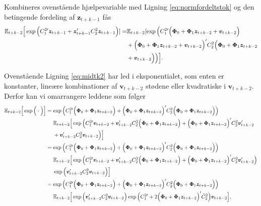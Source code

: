 \documentclass[
  a4paper,
  oneside]{memoir}
\begin{document}
Kombineres ovenstående hjælpevariable med Ligning \eqref{eq:normfordeltstok} og den betingende fordeling af \(\bm{z}_{t+k-1}\) fås
\begin{align}
\mathbb{E}_{t+k-2}\Big[ \exp\Big( C_1^{2\prime} \bm{z}_{t+k-1} + \bm{z}_{t+k-1}' C_2^2 \bm{z}_{t+k-1} \Big) ] = &\mathbb{E}_{t+k-2}[ \exp \Big( C_1^{2\prime} \Big(\bm{\Phi}_0+\bm{\Phi}_1\bm{z}_{t+k-2} + \bm{v}_{t+k-2} \Big) \notag\\
                                                                                                  &+ \Big(\bm{\Phi}_0+\bm{\Phi}_1\bm{z}_{t+k-2} + \bm{v}_{t+k-2}\Big)' C_2^2 \Big(\bm{\Phi}_0+\bm{\Phi}_1\bm{z}_{t+k-2}\notag\\
                                                                                                  &+ \bm{v}_{t+k-2}\Big) \Big) \Big]. \label{eq:midtk2}
\end{align}

Ovenstående Ligning \eqref{eq:midtk2} har led i eksponentialet, som enten er konstanter, lineære kombinationer af \(\bm{v}_{t+k-2}\) stødene eller kvadratiske i \(\bm{v}_{t+k-2}\). Derfor kan vi omarrangere leddene som følger
\begin{align}
\mathbb{E}_{t+k-2}\Big[\exp\Big(\cdot\Big)\Big] &= \exp\Big( C_1^{2\prime} \Big(\bm{\Phi}_0+\bm{\Phi}_1\bm{z}_{t+k-2} \Big) + \Big(\bm{\Phi}_0+\bm{\Phi}_1\bm{z}_{t+k-2} \Big)' C_2^2 \Big(\bm{\Phi}_0+\bm{\Phi}_1\bm{z}_{t+k-2} \Big)\Big) \notag\\
                                &\,\,\quad \mathbb{E}_{t+k-2}\Big[\exp\Big( C_1^{2\prime} \bm{v}_{t+k-2}+ \bm{v}_{t+k-2}' C_2^2 \Big(\bm{\Phi}_0+\bm{\Phi}_1\bm{z}_{t+k-2} \Big) + \Big(\bm{\Phi}_0+\bm{\Phi}_1\bm{z}_{t+k-2} \Big)' C_2^{2} \bm{v}_{t+k-2}' \notag\\
                                &\,\,\quad+ \bm{v}_{t+k-2}' C_2^2 \bm{v}_{t+k-2} \Big)\Big]\notag\\
                                &= \exp\Big( C_1^{2\prime} \Big(\bm{\Phi}_0+\bm{\Phi}_1\bm{z}_{t+k-2} \Big) + \Big(\bm{\Phi}_0+\bm{\Phi}_1\bm{z}_{t+k-2} \Big)' C_2^2 \Big(\bm{\Phi}_0+\bm{\Phi}_1\bm{z}_{t+k-2} \Big)\Big)\notag\\
                                &\,\,\quad \mathbb{E}_{t+k-2}\Big[\exp\Big( C_1^{2\prime} \bm{v}_{t+k-2}+ \bm{v}_{t+k-2}' C_2^2 \Big(\bm{\Phi}_0+\bm{\Phi}_1\bm{z}_{t+k-2} \Big) + \Big(\bm{\Phi}_0+\bm{\Phi}_1\bm{z}_{t+k-2} \Big)' C_2^{2} \bm{v}_{t+k-2}'\Big)\notag\\
                                &\,\,\quad\exp\Big(\bm{v}_{t+k-2}' C_2^2 \bm{v}_{t+k-2} \Big)\Big]\notag\\
                                &=\exp\Big( C_1^{2\prime} \Big(\bm{\Phi}_0+\bm{\Phi}_1\bm{z}_{t+k-2} \Big) + \Big(\bm{\Phi}_0+\bm{\Phi}_1\bm{z}_{t+k-2} \Big)' C_2^2 \Big(\bm{\Phi}_0+\bm{\Phi}_1\bm{z}_{t+k-2} \Big)\Big)\notag\\
                                &\,\,\quad \mathbb{E}_{t+k-2}\Big[ \exp\Big(\bm{v}_{t+k-2}' C_2^2 \bm{v}_{t+k-2} \Big) \exp\Big( C_1^{2\prime} + 2\Big(\bm{\Phi}_0+\bm{\Phi}_1\bm{z}_{t+k-2}\Big)' \Tilde{C}_2^{2} \Big)   \bm{v}_{t+k-2}\Big], \label{eq:langlorteformel}
\end{align}
\end{document}
